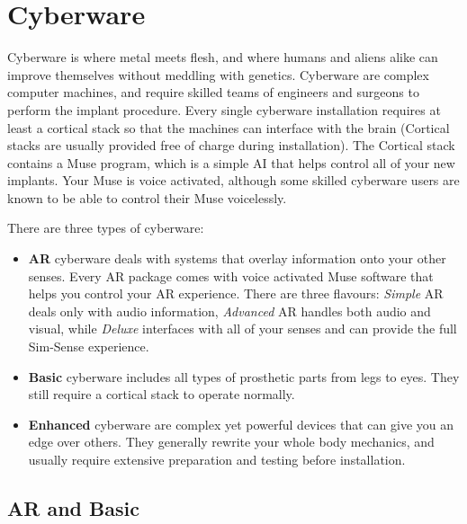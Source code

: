 \documentclass[10pt,twoside]{article}
\begin{document}
  \newpage


  \section{Cyberware}
  
  \begin{multicols}{2}
  
  Cyberware is where metal meets flesh, and where humans and aliens alike can improve themselves without meddling with genetics. Cyberware are complex computer machines, and require skilled teams of engineers and surgeons to perform the implant procedure. Every single cyberware installation requires at least a cortical stack so that the machines can interface with the brain (Cortical stacks are usually provided free of charge during installation). The Cortical stack contains a Muse program, which is a simple AI that helps control all of your new implants. Your Muse is voice activated, although some skilled cyberware users are known to be able to control their Muse voicelessly.
  
  There are three types of cyberware: 
  
  \begin{itemize}
    \item \textbf{AR} cyberware deals with systems that overlay information onto your other senses. Every AR package comes with voice activated Muse software that helps you control your AR experience. There are three flavours: \textit{Simple} AR deals only with audio information, \textit{Advanced} AR handles both audio and visual, while \textit{Deluxe} interfaces with all of your senses and can provide the full Sim-Sense experience.
    \item \textbf{Basic} cyberware includes all types of prosthetic parts from legs to eyes. They still require a cortical stack to operate normally.
    \item \textbf{Enhanced} cyberware are complex yet powerful devices that can give you an edge over others. They generally rewrite your whole body mechanics, and usually require extensive preparation and testing before installation.
  \end{itemize}
  
  \subsection{AR and Basic}
  

\end{multicols}
\end{document}
